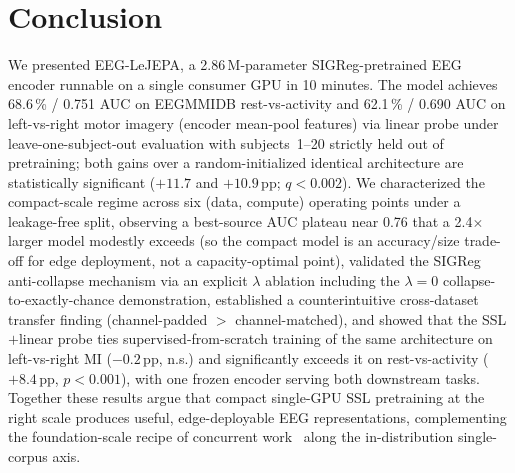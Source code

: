 \section{Conclusion}
\label{sec:conclusion}

We presented EEG-LeJEPA, a 2.86\,M-parameter SIGReg-pretrained EEG
encoder runnable on a single consumer GPU in 10 minutes. The model
achieves 68.6\,\% / 0.751 AUC on EEGMMIDB rest-vs-activity and 62.1\,\% /
0.690 AUC on left-vs-right motor imagery (encoder mean-pool features) via
linear probe under leave-one-subject-out evaluation with subjects~1--20
strictly held out of pretraining; both gains over a random-initialized
identical architecture are statistically significant ($+11.7$ and
$+10.9$\,pp; $q<0.002$). We characterized the compact-scale regime across six (data,
compute) operating points under a leakage-free split, observing a
best-source AUC plateau near 0.76 that a 2.4$\times$ larger model modestly
exceeds (so the compact model is an accuracy/size trade-off for edge
deployment, not a capacity-optimal point), validated the SIGReg
anti-collapse mechanism via an explicit
$\lambda$ ablation including the $\lambda{=}0$ collapse-to-exactly-chance
demonstration, established a counterintuitive cross-dataset transfer
finding (channel-padded $>$ channel-matched), and showed that the SSL$+$linear
probe ties supervised-from-scratch training of the same architecture on
left-vs-right MI ($-0.2$\,pp, n.s.) and significantly exceeds it on
rest-vs-activity ($+8.4$\,pp, $p<0.001$), with one frozen encoder serving
both downstream tasks. Together these results
argue that compact single-GPU SSL pretraining at the right scale produces
useful, edge-deployable EEG representations, complementing the
foundation-scale recipe of concurrent work~\cite{laya2026} along the
in-distribution single-corpus axis.
